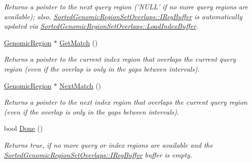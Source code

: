 \begin{DoxyCompactItemize}
\begin{DoxyCompactList}\small\item\em Returns a pointer to the next query region ('NULL' if no more query regions are available); also, \hyperlink{classSortedGenomicRegionSetOverlaps_a19fa18e6abd9f045786698fff48a445f}{SortedGenomicRegionSetOverlaps::IRegBuffer} is automatically updated via \hyperlink{classSortedGenomicRegionSetOverlaps_ad894d118c61c3cd11be8b37b8f185120}{SortedGenomicRegionSetOverlaps::LoadIndexBuffer}. \end{DoxyCompactList}\item 
\hypertarget{classSortedGenomicRegionSetOverlaps_ad0f7b48e1eb685f0aa62aa799088dbc7}{
\hyperlink{classGenomicRegion}{GenomicRegion} $\ast$ \hyperlink{classSortedGenomicRegionSetOverlaps_ad0f7b48e1eb685f0aa62aa799088dbc7}{GetMatch} ()}
\label{classSortedGenomicRegionSetOverlaps_ad0f7b48e1eb685f0aa62aa799088dbc7}

\begin{DoxyCompactList}\small\item\em Returns a pointer to the current index region that overlaps the current query region (even if the overlap is only in the gaps between intervals). \end{DoxyCompactList}\item 
\hypertarget{classSortedGenomicRegionSetOverlaps_a756bad7ba9a862ae27cd9ad52acbeef2}{
\hyperlink{classGenomicRegion}{GenomicRegion} $\ast$ \hyperlink{classSortedGenomicRegionSetOverlaps_a756bad7ba9a862ae27cd9ad52acbeef2}{NextMatch} ()}
\label{classSortedGenomicRegionSetOverlaps_a756bad7ba9a862ae27cd9ad52acbeef2}

\begin{DoxyCompactList}\small\item\em Returns a pointer to the next index region that overlaps the current query region (even if the overlap is only in the gaps between intervals). \end{DoxyCompactList}\item 
\hypertarget{classSortedGenomicRegionSetOverlaps_a726105d1ee63db6271a90e8092e243c9}{
bool \hyperlink{classSortedGenomicRegionSetOverlaps_a726105d1ee63db6271a90e8092e243c9}{Done} ()}
\label{classSortedGenomicRegionSetOverlaps_a726105d1ee63db6271a90e8092e243c9}

\begin{DoxyCompactList}\small\item\em Returns true, if no more query or index regions are available and the \hyperlink{classSortedGenomicRegionSetOverlaps_a19fa18e6abd9f045786698fff48a445f}{SortedGenomicRegionSetOverlaps::IRegBuffer} buffer is empty. \end{DoxyCompactList}\end{DoxyCompactItemize}
